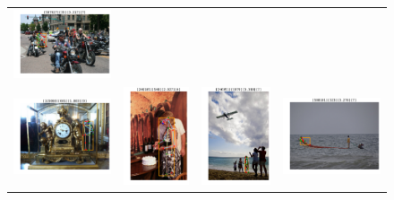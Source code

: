 \documentclass[10pt,onecolumn,letterpaper]{article}
\begin{document}
\begin{figure}[h!]
{\begin{tabular}{c|c|c|c}
\includegraphics[width=.25\linewidth,height=.15\paperwidth,keepaspectratio]{./result/rmpe/localization_errors/keypoints_breakdown/jitter_2.pdf} \\
\includegraphics[width=.25\linewidth,height=.15\paperwidth,keepaspectratio]{./result/rmpe/localization_errors/keypoints_breakdown/miss_3.pdf} &
\includegraphics[width=.25\linewidth,height=.15\paperwidth,keepaspectratio]{./result/rmpe/localization_errors/keypoints_breakdown/swap_3.pdf} &
\includegraphics[width=.25\linewidth,height=.15\paperwidth,keepaspectratio]{./result/rmpe/localization_errors/keypoints_breakdown/inversion_3.pdf} &
\includegraphics[width=.25\linewidth,height=.15\paperwidth,keepaspectratio]{./result/rmpe/localization_errors/keypoints_breakdown/jitter_3.pdf} \\

\end{tabular}}
\end{figure}
\end{document}
